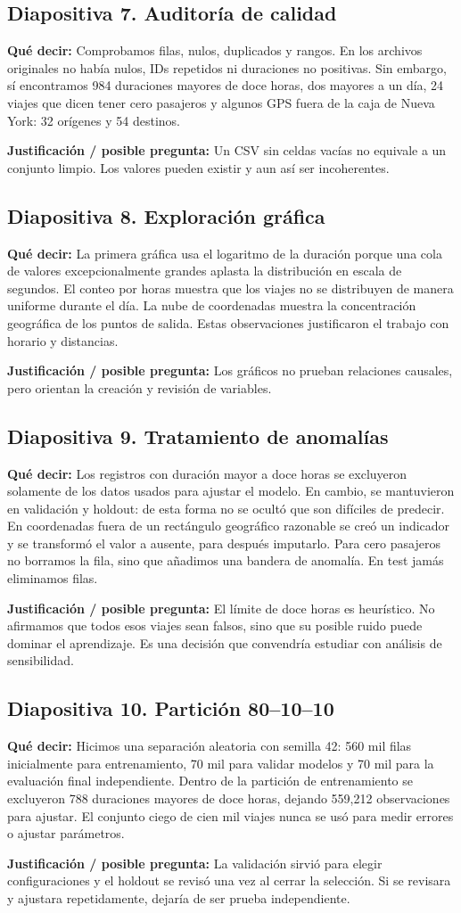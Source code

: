 \documentclass[11pt,letterpaper]{article}
\newcommand{\lamina}[2]{\subsection*{Diapositiva #1. #2}}
\newcommand{\explica}[1]{\noindent\textcolor{azul}{\textbf{Qué decir:}} #1\par\smallskip}
\newcommand{\defiende}[1]{\noindent\textcolor{verde}{\textbf{Justificación / posible pregunta:}} #1\par\medskip}
\begin{document}
\lamina{7}{Auditoría de calidad}
\explica{Comprobamos filas, nulos, duplicados y rangos. En los archivos originales no había nulos, IDs repetidos ni duraciones no positivas. Sin embargo, sí encontramos 984 duraciones mayores de doce horas, dos mayores a un día, 24 viajes que dicen tener cero pasajeros y algunos GPS fuera de la caja de Nueva York: 32 orígenes y 54 destinos.}
\defiende{Un CSV sin celdas vacías no equivale a un conjunto limpio. Los valores pueden existir y aun así ser incoherentes.}

\lamina{8}{Exploración gráfica}
\explica{La primera gráfica usa el logaritmo de la duración porque una cola de valores excepcionalmente grandes aplasta la distribución en escala de segundos. El conteo por horas muestra que los viajes no se distribuyen de manera uniforme durante el día. La nube de coordenadas muestra la concentración geográfica de los puntos de salida. Estas observaciones justificaron el trabajo con horario y distancias.}
\defiende{Los gráficos no prueban relaciones causales, pero orientan la creación y revisión de variables.}

\lamina{9}{Tratamiento de anomalías}
\explica{Los registros con duración mayor a doce horas se excluyeron solamente de los datos usados para ajustar el modelo. En cambio, se mantuvieron en validación y holdout: de esta forma no se ocultó que son difíciles de predecir. En coordenadas fuera de un rectángulo geográfico razonable se creó un indicador y se transformó el valor a ausente, para después imputarlo. Para cero pasajeros no borramos la fila, sino que añadimos una bandera de anomalía. En test jamás eliminamos filas.}
\defiende{El límite de doce horas es heurístico. No afirmamos que todos esos viajes sean falsos, sino que su posible ruido puede dominar el aprendizaje. Es una decisión que convendría estudiar con análisis de sensibilidad.}

\lamina{10}{Partición 80--10--10}
\explica{Hicimos una separación aleatoria con semilla 42: 560 mil filas inicialmente para entrenamiento, 70 mil para validar modelos y 70 mil para la evaluación final independiente. Dentro de la partición de entrenamiento se excluyeron 788 duraciones mayores de doce horas, dejando 559,212 observaciones para ajustar. El conjunto ciego de cien mil viajes nunca se usó para medir errores o ajustar parámetros.}
\defiende{La validación sirvió para elegir configuraciones y el holdout se revisó una vez al cerrar la selección. Si se revisara y ajustara repetidamente, dejaría de ser prueba independiente.}
\end{document}
